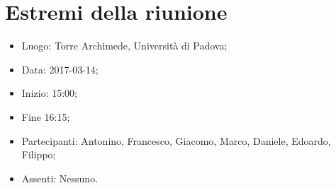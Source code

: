 \documentclass[../verbale-2017-03-14.tex]{subfiles}
\begin{document}
\section{Estremi della riunione}
	\begin{itemize}
		\item Luogo: Torre Archimede, Università di Padova;
        \item Data: 2017-03-14;
        \item Inizio: 15:00;
        \item Fine 16:15;
		\item Partecipanti: Antonino, Francesco, Giacomo, Marco, Daniele, Edoardo, Filippo;
        \item Assenti: Nessuno.
	\end{itemize}
\end{document}
